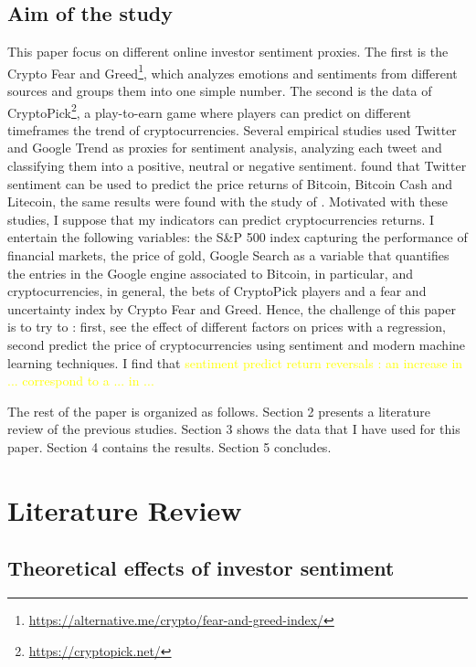 \documentclass{article}
\begin{document}
	\subsection{Aim of the study}
	
	This paper focus on different online investor sentiment proxies. The first is the Crypto Fear and Greed\footnote{\href{https://alternative.me/crypto/fear-and-greed-index/}{https://alternative.me/crypto/fear-and-greed-index/}}, which analyzes emotions and sentiments from different sources and groups them into one simple number. The second is the data of CryptoPick\footnote{\href{https://cryptopick.net/}{https://cryptopick.net/}}, a play-to-earn game where players can predict on different timeframes the trend of cryptocurrencies. Several empirical studies used Twitter and Google Trend as proxies for sentiment analysis, analyzing each tweet and classifying them into a positive, neutral or negative sentiment. \cite{tppop} found that Twitter sentiment can be used to predict the price returns of Bitcoin, Bitcoin Cash and Litecoin, the same results were found with the study of \cite{prooi}. Motivated with these studies, I suppose that my indicators can predict cryptocurrencies returns. I entertain the following variables: the S&P 500 index capturing the performance of financial markets, the price of gold, Google Search as a variable that quantifies the entries in the Google engine associated to Bitcoin, in particular, and cryptocurrencies, in general, the bets of CryptoPick players and a fear and uncertainty index by Crypto Fear and Greed. Hence, the challenge of this paper is to try to : first, see the effect of different factors on prices with a regression, second predict the price of cryptocurrencies using sentiment and modern machine learning techniques. I find that \textcolor{yellow}{sentiment predict return reversals : an increase in ... correspond to a ... in ... }
	
	The rest of the paper is organized as follows. Section 2 presents a literature review of the previous studies. Section 3 shows the data that I have used for this paper. Section 4 contains the results. Section 5 concludes. 
	
	\section{Literature Review}
	\subsection{Theoretical effects of investor sentiment}
	
\end{document}
